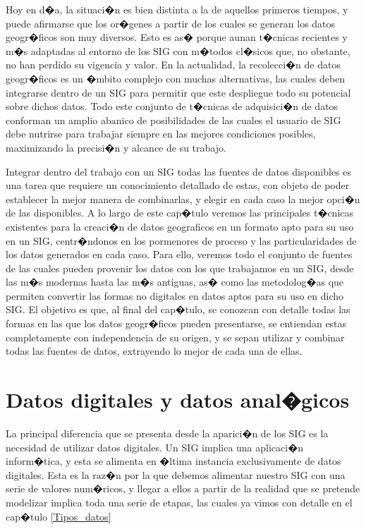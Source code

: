 Hoy en d�a, la situaci�n es bien distinta a la de aquellos primeros tiempos, y puede afirmarse que los or�genes a partir de los cuales se generan los datos geogr�ficos son muy diversos. Esto es as� porque aunan t�cnicas recientes y m�s adaptadas al entorno de los SIG con m�todos cl�sicos que, no obstante, no han perdido su vigencia y valor. En la actualidad, la recolecci�n de datos geogr�ficos es un �mbito complejo con muchas alternativas, las cuales deben integrarse dentro de un SIG para permitir que este despliegue todo su potencial sobre dichos datos. Todo este conjunto de t�cnicas de adquisici�n de datos conforman un amplio abanico de posibilidades de las cuales el usuario de SIG debe nutrirse para trabajar siempre en las mejores condiciones posibles, maximizando la precisi�n y alcance de su trabajo.

Integrar dentro del trabajo con un SIG todas las fuentes de datos disponibles es una tarea que requiere un conocimiento detallado de estas, con objeto de poder establecer la mejor manera de combinarlas, y elegir en cada caso la mejor opci�n de las disponibles. A lo largo de este cap�tulo veremos las principales t�cnicas existentes para la creaci�n de datos geograficos en un formato apto para su uso en un SIG, centr�ndonos en los pormenores de proceso y las particularidades de los datos generados en cada caso. Para ello, veremos todo el conjunto de fuentes de las cuales pueden provenir los datos con los que trabajamos en un SIG, desde las m�s modernas hasta las m�s antiguas, as� como las metodolog�as que permiten convertir las formas no digitales en datos aptos para su uso en dicho SIG. El objetivo es que, al final del cap�tulo, se conozcan con detalle todas las formas en las que los datos geogr�ficos pueden presentarse, se entiendan estas completamente con independencia de su origen, y se sepan utilizar y combinar todas las fuentes de datos, extrayendo lo mejor de cada una de ellas.

\section{Datos digitales y datos anal�gicos}
\label{Datos_digitales_y_analogicos}

La principal diferencia que se presenta desde la aparici�n de los SIG es la necesidad de utilizar datos digitales. Un SIG implica una aplicaci�n inform�tica, y esta se alimenta en �ltima instancia exclusivamente de datos digitales. Esta es la raz�n por la que debemos alimentar nuestro SIG con una serie de valores num�ricos, y llegar a ellos a partir de la realidad que se pretende modelizar implica toda una serie de etapas, las cuales ya vimos con detalle en el cap�tulo \ref{Tipos_datos}

